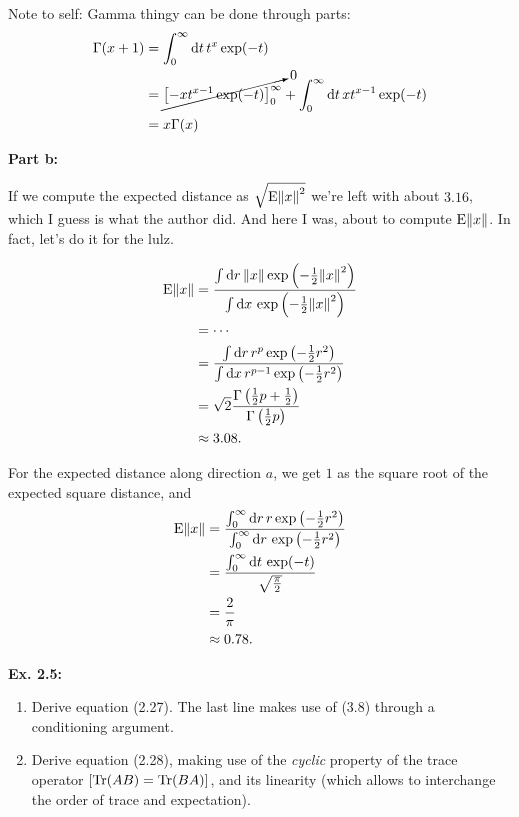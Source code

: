 \documentclass{article}
\begin{document}
Note to self: Gamma thingy can be done through parts:
\begin{align}
	\Gamma(x+1)&=\int_0^\infty\mathrm dt\,t^x\exp(-t)\\
	&=\cancelto{0}{\left[-xt^{x-1}\exp(-t)\right]_0^\infty}+\int_0^\infty\mathrm dt\,xt^{x-1}\exp(-t)\\
	&=x\Gamma(x)
\end{align}

\textbf{Part b:}

If we compute the expected distance as $\sqrt{\mathrm E\norm{x}^2}$ we're left with about $3.16$, which I guess is what the author did. And here I was, about to compute $\mathrm E\norm{x}$. In fact, let's do it for the lulz.

\begin{align}
	\mathrm E\norm{x}&=\frac{\int\mathrm dr\,\norm{x}\exp\left(-\frac12\norm{x}^2\right)}{\int\mathrm dx\,\exp\left(-\frac12\norm{x}^2\right)}\\
	&=\cdots\\
	&=\frac{\int\mathrm dr\,r^p\exp\left(-\frac12r^2\right)}{\int\mathrm dx\,r^{p-1}\exp\left(-\frac12r^2\right)}\\
	&=\sqrt{2}\frac{\Gamma\left(\frac12p+\frac12\right)}{\Gamma\left(\frac12p\right)}\\
	&\approx3.08.
\end{align}

For the expected distance along direction $a$, we get $1$ as the square root of the expected square distance, and
\begin{align}
	\mathrm E\norm{x}&=\frac{\int_0^\infty\mathrm dr\,r\exp\left(-\frac12r^2\right)}{\int_0^\infty\mathrm dr\,\exp\left(-\frac12r^2\right)}\\
	&=\frac{\int_0^\infty\mathrm dt\,\exp(-t)}{\sqrt{\frac\pi2}}\\
	&=\frac2\pi\\
	&\approx0.78.
\end{align}

\textbf{Ex. 2.5: }

\begin{enumerate}[label=\alph*]
	\item Derive equation (2.27). The last line makes use of (3.8) through a conditioning argument.
	\item Derive equation (2.28), making use of the \textit{cyclic} property of the trace operator $[\Tr(AB)=\Tr(BA)]$, and its linearity (which allows to interchange the order of trace and expectation).
\end{enumerate}
\end{document}
